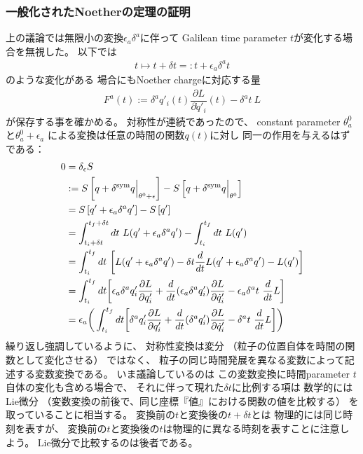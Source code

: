 \subsubsection{一般化されたNoetherの定理の証明}

上の議論では無限小の変換$\epsilon_a \delta^a$に伴って
Galilean time parameter $t$が変化する場合を無視した。
以下では
\begin{align}
  t
  \mapsto t + \delta t
  =: t + \epsilon_a \delta^a t
\end{align}
のような変化がある
場合にもNoether chargeに対応する量
\begin{align}
  F^a(t):=
    \delta^a q'_i (t)
  \dfrac{\partial L}{\partial \dot{q}'_i} (t)
-
  \delta^a t
  \ 
  L
\end{align}
が保存する事を確かめる。
対称性が連続であったので、
constant parameter $\theta_a^0$と$\theta_a^0 + \epsilon_a$
による変換は任意の時間の関数$q(t)$に対し
同一の作用を与えるはずである：
\begin{align}
  0 &=
  \delta_{\epsilon} S
\notag\\&:=
  S\left[ q + \delta^{\mathrm{sym}} q\Big|_{\theta^0 + \epsilon} \right]
  -
  S\left[ q + \delta^{\mathrm{sym}} q\Big|_{\theta^0} \right]
\notag\\&=
  S\left[ q' + \epsilon_a \delta^a q' \right]
  -
  S\left[ q' \right]
\notag\\&=
  \int_{t_i + \delta t}^{t_f + \delta t} dt\ 
    L( q' + \epsilon_a \delta^a q' )
  -
  \int_{t_i}^{t_f} dt\ 
    L( q' )
\notag\\&=
  \int_{t_i}^{t_f} dt\ 
  \bigg[
    L( q' + \epsilon_a \delta^a q' )
    - \delta t
    \dfrac{d}{dt}
    L( q' + \epsilon_a \delta^a q' )
  -
    L( q' )
  \bigg]
\notag\\&=
  \int_{t_i}^{t_f} dt
  \bigg[
    \epsilon_a
    \delta^a q'_i
    \dfrac{\partial L}{\partial q'_i}
  +
  \dfrac{d}{dt}
    (\epsilon_a
    \delta^a q'_i)
    \dfrac{\partial L}{\partial \dot{q}'_i}
  -
    \epsilon_a
    \delta^a t
    \ 
    \dfrac{d}{dt}
    L
  \bigg]
\notag\\&=
    \epsilon_a
  \bigg(
  \int_{t_i}^{t_f} dt
  \bigg[
    \delta^a q'_i
    \dfrac{\partial L}{\partial q'_i}
  +
    \dfrac{d}{dt}
    (\delta^a q'_i)
    \dfrac{\partial L}{\partial \dot{q}'_i}
  -
    \delta^a t
    \ 
    \dfrac{d}{dt}
    L
  \bigg]
  \bigg)
\label{action difference under symmetry transformation}
\end{align}
繰り返し強調しているように、
対称性変換は変分
（粒子の位置自体を時間の関数として変化させる）
ではなく、
粒子の同じ時間発展を異なる変数によって記述する変数変換である。
いま議論しているのは
この変数変換に時間parameter $t$自体の変化も含める場合で、
それに伴って現れた$\delta t$に比例する項は
数学的にはLie微分
（変数変換の前後で、同じ座標『値』における関数の値を比較する）
を取っていることに相当する。
変換前の$t$と変換後の$t + \delta t$とは
物理的には同じ時刻を表すが、
変換前の$t$と変換後の$t$は物理的に異なる時刻を表すことに注意しよう。
Lie微分で比較するのは後者である。

